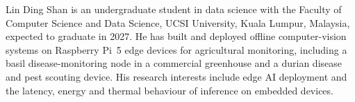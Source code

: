 \documentclass[10pt,journal,compsoc]{IEEEtran}
\begin{document}



\begin{IEEEbiographynophoto}{Lin Ding Shan}
is an undergraduate student in data science with the Faculty of Computer Science and Data Science, UCSI University, Kuala Lumpur, Malaysia, expected to graduate in 2027. He has built and deployed offline computer-vision systems on Raspberry Pi~5 edge devices for agricultural monitoring, including a basil disease-monitoring node in a commercial greenhouse and a durian disease and pest scouting device. His research interests include edge AI deployment and the latency, energy and thermal behaviour of inference on embedded devices.
\end{IEEEbiographynophoto}
\end{document}

